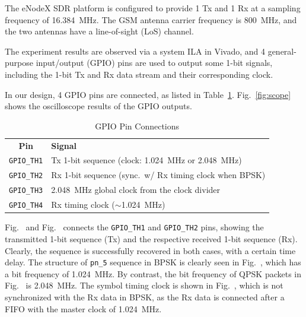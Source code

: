 \documentclass[journal,twoside]{IEEEtran}
\begin{document}
    The eNodeX SDR platform is configured to provide 1 Tx and 1 Rx
    at a sampling frequency of \qty{16.384}{MHz}.
    The GSM antenna carrier frequency is \qty{800}{MHz},
    and the two antennas have a line-of-sight (LoS) channel.

    The experiment results are observed via a system ILA in Vivado,
    and 4 general-purpose input/output (GPIO) pins are used to output some 1-bit signals,
    including the 1-bit Tx and Rx data stream and their corresponding clock.

    In our design, 4 GPIO pins are connected, as listed in Table~\ref{tab:gpio_pins}.
    Fig.~\ref{fig:scope} shows the oscilloscope results of the GPIO outputs.
    \begin{table}[htbp]
      \caption{GPIO Pin Connections}
      \label{tab:gpio_pins}
      \renewcommand{\arraystretch}{1.2}
      \begin{tabularx}{\linewidth}{cX}
        \toprule\tabvertspace
        \textbf{Pin} & \textbf{Signal} \\
        \tabvertspace\midrule
        \texttt{GPIO\_TH1} & Tx 1-bit sequence (clock: \qty{1.024}{MHz} or \qty{2.048}{MHz}) \\
        \texttt{GPIO\_TH2} & Rx 1-bit sequence (sync.\ w/ Rx timing clock when BPSK) \\
        \texttt{GPIO\_TH3} & \qty{2.048}{MHz} global clock from the clock divider \\
        \texttt{GPIO\_TH4} & Rx timing clock ($\sim$\qty{1.024}{MHz}) \\
        \bottomrule
      \end{tabularx}
    \end{table}

    Fig.~ and Fig.~
    connects the \texttt{GPIO\_TH1} and \texttt{GPIO\_TH2} pins,
    showing the transmitted 1-bit sequence (Tx) and the respective received 1-bit sequence (Rx).
    Clearly, the sequence is successfully recovered in both cases, with a certain time delay.
    The structure of \texttt{pn\_5} sequence in BPSK is clearly seen in Fig.~,
    which has a bit frequency of \qty{1.024}{MHz}.
    By contrast, the bit frequency of QPSK packets in Fig.~ is \qty{2.048}{MHz}.
    The symbol timing clock is shown in Fig.~,
    which is not synchronized with the Rx data in BPSK,
    as the Rx data is connected after a FIFO with the master clock of \qty{1.024}{MHz}.
\end{document}

